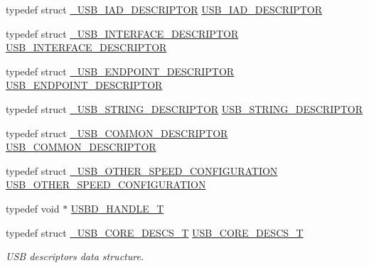 \begin{DoxyCompactItemize}
typedef struct \hyperlink{struct___u_s_b___i_a_d___d_e_s_c_r_i_p_t_o_r}{\+\_\+\+U\+S\+B\+\_\+\+I\+A\+D\+\_\+\+D\+E\+S\+C\+R\+I\+P\+T\+OR} \hyperlink{group___u_s_b_d___core_ga6b053e842151d5c5dcdace597e45a36b}{U\+S\+B\+\_\+\+I\+A\+D\+\_\+\+D\+E\+S\+C\+R\+I\+P\+T\+OR}
\item 
typedef struct \hyperlink{struct___u_s_b___i_n_t_e_r_f_a_c_e___d_e_s_c_r_i_p_t_o_r}{\+\_\+\+U\+S\+B\+\_\+\+I\+N\+T\+E\+R\+F\+A\+C\+E\+\_\+\+D\+E\+S\+C\+R\+I\+P\+T\+OR} \hyperlink{group___u_s_b_d___core_gac933513ce6cbf852d0dc998bd8fb333d}{U\+S\+B\+\_\+\+I\+N\+T\+E\+R\+F\+A\+C\+E\+\_\+\+D\+E\+S\+C\+R\+I\+P\+T\+OR}
\item 
typedef struct \hyperlink{struct___u_s_b___e_n_d_p_o_i_n_t___d_e_s_c_r_i_p_t_o_r}{\+\_\+\+U\+S\+B\+\_\+\+E\+N\+D\+P\+O\+I\+N\+T\+\_\+\+D\+E\+S\+C\+R\+I\+P\+T\+OR} \hyperlink{group___u_s_b_d___core_ga652b2871268bd903653cbff0f3448a6e}{U\+S\+B\+\_\+\+E\+N\+D\+P\+O\+I\+N\+T\+\_\+\+D\+E\+S\+C\+R\+I\+P\+T\+OR}
\item 
typedef struct \hyperlink{struct___u_s_b___s_t_r_i_n_g___d_e_s_c_r_i_p_t_o_r}{\+\_\+\+U\+S\+B\+\_\+\+S\+T\+R\+I\+N\+G\+\_\+\+D\+E\+S\+C\+R\+I\+P\+T\+OR} \hyperlink{group___u_s_b_d___core_gabccfa24c1955b99a76219a89b8e6f3b6}{U\+S\+B\+\_\+\+S\+T\+R\+I\+N\+G\+\_\+\+D\+E\+S\+C\+R\+I\+P\+T\+OR}
\item 
typedef struct \hyperlink{struct___u_s_b___c_o_m_m_o_n___d_e_s_c_r_i_p_t_o_r}{\+\_\+\+U\+S\+B\+\_\+\+C\+O\+M\+M\+O\+N\+\_\+\+D\+E\+S\+C\+R\+I\+P\+T\+OR} \hyperlink{group___u_s_b_d___core_gae20aa0e1d1e5418dbef678b53b2c3ebe}{U\+S\+B\+\_\+\+C\+O\+M\+M\+O\+N\+\_\+\+D\+E\+S\+C\+R\+I\+P\+T\+OR}
\item 
typedef struct \hyperlink{struct___u_s_b___o_t_h_e_r___s_p_e_e_d___c_o_n_f_i_g_u_r_a_t_i_o_n}{\+\_\+\+U\+S\+B\+\_\+\+O\+T\+H\+E\+R\+\_\+\+S\+P\+E\+E\+D\+\_\+\+C\+O\+N\+F\+I\+G\+U\+R\+A\+T\+I\+ON} \hyperlink{group___u_s_b_d___core_ga808d47bcf11e648d95efc88e330fabc5}{U\+S\+B\+\_\+\+O\+T\+H\+E\+R\+\_\+\+S\+P\+E\+E\+D\+\_\+\+C\+O\+N\+F\+I\+G\+U\+R\+A\+T\+I\+ON}
\item 
typedef void $\ast$ \hyperlink{group___u_s_b_d___core_gafdbb2204d929cb9d75736bd2b42342ac}{U\+S\+B\+D\+\_\+\+H\+A\+N\+D\+L\+E\+\_\+T}
\item 
typedef struct \hyperlink{struct___u_s_b___c_o_r_e___d_e_s_c_s___t}{\+\_\+\+U\+S\+B\+\_\+\+C\+O\+R\+E\+\_\+\+D\+E\+S\+C\+S\+\_\+T} \hyperlink{group___u_s_b_d___core_gabdc617d119eac0555f91bea957c41ecc}{U\+S\+B\+\_\+\+C\+O\+R\+E\+\_\+\+D\+E\+S\+C\+S\+\_\+T}
\begin{DoxyCompactList}\small\item\em U\+SB descriptors data structure. \end{DoxyCompactList}\item 

\end{DoxyCompactItemize}
